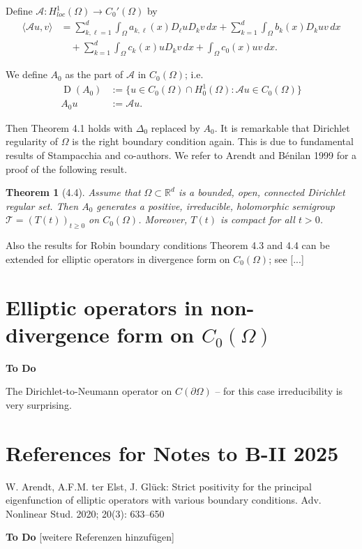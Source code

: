 \documentclass[11pt]{article}
\newtheorem{theorem}{Theorem}[section]
\DeclareMathOperator{\dom}{D}
\begin{document}
Define $\mathcal{A} : H^1_{loc}(\Omega) \to C_0'(\Omega)$ by
\begin{align}
\langle \mathcal{A}u, v \rangle &= \sum_{k,\ell=1}^d \int_\Omega a_{k,\ell}(x) D_\ell u D_k v \, dx + \sum_{k=1}^d \int_\Omega b_k(x) D_k u v \, dx\\
&\quad + \sum_{k=1}^d \int_\Omega c_k(x) u D_k v \, dx + \int_\Omega c_0(x) u v \, dx.
\end{align}

We define $A_0$ as the part of $\mathcal{A}$ in $C_0(\Omega)$; i.e.
\begin{align}
\dom(A_0) &:= \{u \in C_0(\Omega) \cap H^1_0(\Omega) : \mathcal{A}u \in C_0(\Omega)\}\\
A_0 u &:= \mathcal{A}u.
\end{align}

Then Theorem 4.1 holds with $\Delta_0$ replaced by $A_0$. It is remarkable that Dirichlet regularity of $\Omega$ is the right boundary condition again. This is due to fundamental results of Stampacchia and co-authors. We refer to Arendt and Bénilan 1999 for a proof of the following result.

\begin{theorem}[4.4]
Assume that $\Omega \subset \mathbb{R}^d$ is a bounded, open, connected Dirichlet regular set. Then $A_0$ generates a positive, irreducible, holomorphic semigroup $\mathcal{T} = (T(t))_{t \geq 0}$ on $C_0(\Omega)$. Moreover, $T(t)$ is compact for all $t > 0$.
\end{theorem}

Also the results for Robin boundary conditions Theorem 4.3 and 4.4 can be extended for elliptic operators in divergence form on $C_0(\Omega)$; see [...]

\section{Elliptic operators in non-divergence form on $C_0(\Omega)$}

\textbf{To Do}

The Dirichlet-to-Neumann operator on $C(\partial\Omega)$ -- for this case irreducibility is very surprising.

\section*{References for Notes to B-II 2025}

W. Arendt, A.F.M. ter Elst, J. Glück: Strict positivity for the principal eigenfunction of elliptic operators with various boundary conditions. Adv. Nonlinear Stud. 2020; 20(3): 633--650

\textbf{To Do} [weitere Referenzen hinzufügen]
\end{document}
